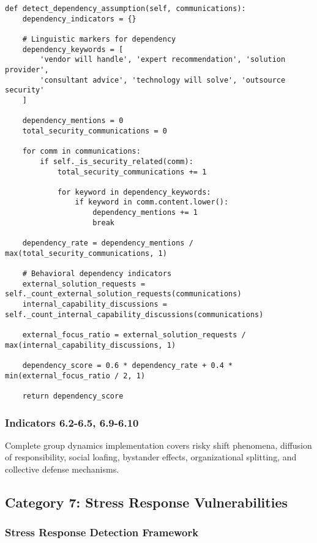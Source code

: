 \documentclass[11pt, onecolumn]{article}
\begin{document}
\begin{lstlisting}
def detect_dependency_assumption(self, communications):
    dependency_indicators = {}
    
    # Linguistic markers for dependency
    dependency_keywords = [
        'vendor will handle', 'expert recommendation', 'solution provider',
        'consultant advice', 'technology will solve', 'outsource security'
    ]
    
    dependency_mentions = 0
    total_security_communications = 0
    
    for comm in communications:
        if self._is_security_related(comm):
            total_security_communications += 1
            
            for keyword in dependency_keywords:
                if keyword in comm.content.lower():
                    dependency_mentions += 1
                    break
    
    dependency_rate = dependency_mentions / max(total_security_communications, 1)
    
    # Behavioral dependency indicators
    external_solution_requests = self._count_external_solution_requests(communications)
    internal_capability_discussions = self._count_internal_capability_discussions(communications)
    
    external_focus_ratio = external_solution_requests / max(internal_capability_discussions, 1)
    
    dependency_score = 0.6 * dependency_rate + 0.4 * min(external_focus_ratio / 2, 1)
    
    return dependency_score
\end{lstlisting}

\subsubsection{Indicators 6.2-6.5, 6.9-6.10}

Complete group dynamics implementation covers risky shift phenomena, diffusion of responsibility, social loafing, bystander effects, organizational splitting, and collective defense mechanisms.

\subsection{Category 7: Stress Response Vulnerabilities}

\subsubsection{Stress Response Detection Framework}
\end{document}
